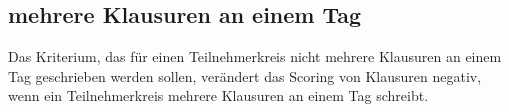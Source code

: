 \subsection{mehrere Klausuren an einem Tag}
Das Kriterium, das für einen Teilnehmerkreis nicht mehrere Klausuren an einem Tag geschrieben
werden sollen, verändert das Scoring von Klausuren negativ, wenn ein Teilnehmerkreis
mehrere Klausuren an einem Tag schreibt.